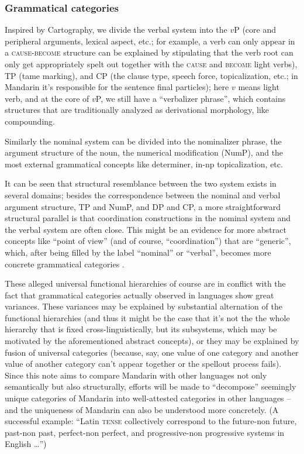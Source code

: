 \documentclass[UTF8, a4paper, oneside, scheme=plain, 12pt]{ctexrep}
\newcommand*{\category}[1]{\textsc{#1}}
\begin{document}
{\subsubsection{Grammatical categories}

Inspired by Cartography, 
we divide the verbal system into the $v$P 
(core and peripheral arguments, lexical aspect, etc.;
for example, a verb can only appear in a \category{cause-become} structure 
can be explained by stipulating that 
the verb root can only get appropriately spelt out
together with the \category{cause} and \category{become} light verbs), 
TP (\ac{tame} marking), 
and CP (the clause type, speech force, topicalization, etc.; 
in Mandarin it's responsible for the sentence final particles); 
here $v$ means light verb, 
and at the core of $v$P, 
we still have a ``verbalizer phrase'', 
which contains structures that are traditionally analyzed 
as derivational morphology, 
like compounding.

Similarly the nominal system can be divided into 
the nominalizer phrase, 
the argument structure of the noun, 
the numerical modification (NumP), 
and the most external grammatical concepts like 
determiner, in-\acs{np} topicalization, etc. 

It can be seen that structural resemblance between the two system 
exists in several domains; 
besides the correspondence between 
the nominal and verbal argument structure, 
TP and NumP, 
and DP and CP, 
a more straightforward structural parallel 
is that coordination constructions in the nominal system 
and the verbal system are often close. 
This might be an evidence for more abstract concepts 
like ``point of view'' (and of course, ``coordination'')
that are ``generic'', 
which, after being filled by the label ``nominal'' or ``verbal'', 
becomes more concrete grammatical categories
\citep{wiltschko2014universal}. 

These alleged universal functional hierarchies
of course are in conflict with the fact that 
grammatical categories actually observed in languages 
show great variances. 
These variances may be explained by substantial alternation 
of the functional hierarchies 
(and thus it might be the case that 
it's not the the whole hierarchy that is fixed cross-linguistically,
but its subsystems, which may be motivated by the aforementioned abstract concepts),
or they may be explained by fusion of universal categories 
(because, say, one value of one category and another value of another category 
can't appear together or the spellout process fails).
Since this note aims to compare Mandarin with other languages 
not only semantically but also structurally, 
efforts will be made to ``decompose'' seemingly unique 
categories of Mandarin into well-attested categories in other languages -- 
and the uniqueness of Mandarin can also be understood more concretely. 
(A successful example: ``Latin \category{tense} 
collectively correspond to the future-non future, 
past-non past, perfect-non perfect, and progressive-non progressive 
systems in English \dots'')



}
\end{document}
